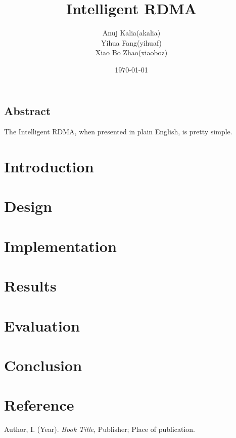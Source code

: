 \documentclass[oneside, 12pt]{article}
\title{Intelligent RDMA} %
\author{Anuj Kalia(akalia)\\
		Yihua Fang(yihuaf)\\
		Xiao Bo Zhao(xiaoboz)}
\date{\today} %
\begin{document}
\maketitle
\thispagestyle{empty}
\newpage
\begin{center}
\vspace*{\fill}
\section*{Abstract}
The Intelligent RDMA, when presented in plain English, is pretty simple.\\
\vspace*{\fill}
\newpage
\end{center}


\section{Introduction}
\section{Design}
\section{Implementation}
\section{Results}
\section{Evaluation}
\section{Conclusion}

\newpage
\section*{Reference}
%
\begin{description}
\item Author, I. (Year). \emph{Book Title}, Publisher; Place of publication.

\end{description}
\end{document}
